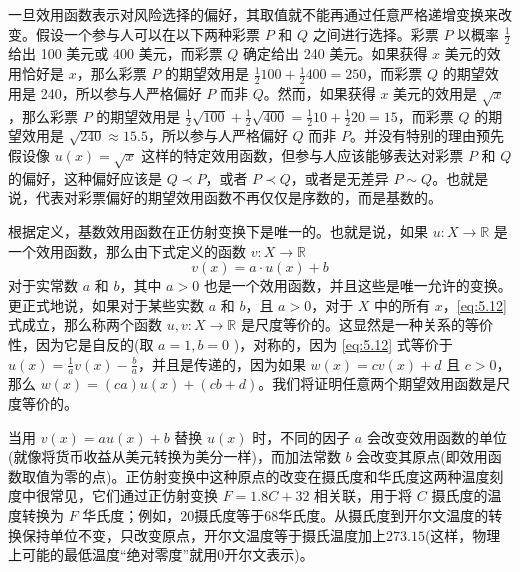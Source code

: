一旦效用函数表示对风险选择的偏好，其取值就不能再通过任意严格递增变换来改变。假设一个参与人可以在以下两种彩票 \(P\) 和 \(Q\) 之间进行选择。彩票 \(P\) 以概率 \(\frac{1}{2}\) 给出 100 美元或 400 美元，而彩票 \(Q\) 确定给出 240 美元。如果获得 \(x\) 美元的效用恰好是 \(x\)，那么彩票 \(P\) 的期望效用是 \(\frac{1}{2}{100} + \frac{1}{2}{400} = {250}\)，而彩票 \(Q\) 的期望效用是 240，所以参与人严格偏好 \(P\) 而非 \(Q\)。然而，如果获得 \(x\) 美元的效用是 \(\sqrt{x}\)，那么彩票 \(P\) 的期望效用是 \(\frac{1}{2}\sqrt{100} + \frac{1}{2}\sqrt{400} = \frac{1}{2}{10} + \frac{1}{2}{20} = {15}\)，而彩票 \(Q\) 的期望效用是 \(\sqrt{240} \approx  {15.5}\)，所以参与人严格偏好 \(Q\) 而非 \(P\)。并没有特别的理由预先假设像 \(u\left( x\right)  = \sqrt{x}\) 这样的特定效用函数，但参与人应该能够表达对彩票 \(P\) 和 \(Q\) 的偏好，这种偏好应该是 \(Q \prec  P\)，或者 \(P \prec  Q\)，或者是无差异 \(P \sim  Q\)。也就是说，代表对彩票偏好的期望效用函数不再仅仅是序数的，而是基数的。

根据定义，基数效用函数在正仿射变换下是唯一的。也就是说，如果 \(u : X \rightarrow  \mathbb{R}\) 是一个效用函数，那么由下式定义的函数 \(v : X \rightarrow  \mathbb{R}\)
\begin{equation}
\label{eq:5.12}
v\left( x\right)  = a \cdot  u\left( x\right)  + b
\end{equation}
对于实常数 \(a\) 和 \(b\)，其中 \(a > 0\) 也是一个效用函数，并且这些是唯一允许的变换。更正式地说，如果对于某些实数 \(a\) 和 \(b\)，且 \(a > 0\)，对于 \(X\) 中的所有 \(x\)，\eqref{eq:5.12} 式成立，那么称两个函数 \(u,v : X \rightarrow  \mathbb{R}\) 是尺度等价的。这显然是一种关系的等价性，因为它是自反的(取 \(a = 1,b = 0\) )，对称的，因为 \eqref{eq:5.12} 式等价于 \(u\left( x\right)  = \frac{1}{a}v\left( x\right)  - \frac{b}{a}\)，并且是传递的，因为如果 \(w\left( x\right)  = {cv}\left( x\right)  + d\) 且 \(c > 0\)，那么 \(w\left( x\right)  = \left( {ca}\right) u\left( x\right)  + \left( {{cb} + d}\right)\)。我们将证明任意两个期望效用函数是尺度等价的。

当用 \(v\left( x\right)  = {au}\left( x\right)  + b\) 替换 \(u\left( x\right)\) 时，不同的因子 \(a\) 会改变效用函数的单位(就像将货币收益从美元转换为美分一样)，而加法常数 \(b\) 会改变其原点(即效用函数取值为零的点)。正仿射变换中这种原点的改变在摄氏度和华氏度这两种温度刻度中很常见，它们通过正仿射变换 \(F = {1.8C} + {32}\) 相关联，用于将 \(C\) 摄氏度的温度转换为 \(F\) 华氏度；例如，$20$摄氏度等于$68$华氏度。从摄氏度到开尔文温度的转换保持单位不变，只改变原点，开尔文温度等于摄氏温度加上$273.15$(这样，物理上可能的最低温度“绝对零度”就用$0$开尔文表示)。

